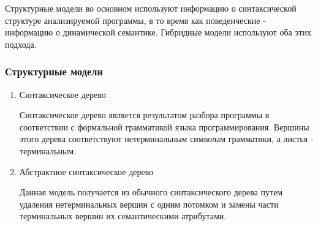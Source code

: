 Структурные модели во основном используют информацию о синтаксической структуре
анализируемой программы, в то время как поведенческие - информацию о
динамической семантике. Гибридные модели используют оба этих подхода.

\subsubsection{Структурные модели}
\begin{enumerate}
    \item Синтаксическое дерево

    Синтаксическое дерево является результатом разбора программы в
    соответствии с формальной грамматикой языка программирования. Вершины
    этого дерева соответствуют нетерминальным символам грамматики, а листья
    - терминальным.

    \item Абстрактное синтаксическое дерево

    Данная модель получается из обычного синтаксического дерева путем
    удаления нетерминальных вершин с одним потомком и замены части
    терминальных вершин их семантическими атрибутами.
\end{enumerate}

